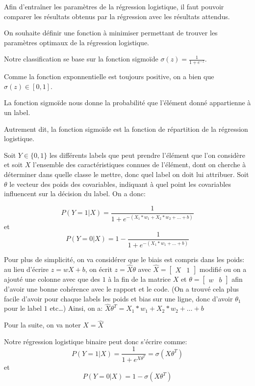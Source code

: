 \documentclass[
]{article}
\begin{document}
Afin d'entraîner les paramètres de la régression logistique, il faut
pouvoir comparer les résultats obtenus par la régression avec les
résultats attendus.

On souhaite définir une fonction à minimiser permettant de trouver les
paramètres optimaux de la régression logistique.

Notre classification se base sur la fonction sigmoïde
\(\sigma(z) = \frac{1}{1 + e^{-z}}\).

Comme la fonction exponnentielle est toujours positive, on a bien que
\(\sigma(z) \in [0, 1]\).

La fonction sigmoïde nous donne la probabilité que l'élément donné
appartienne à un label.

Autrement dit, la fonction sigmoïde est la fonction de répartition de la
régression logistique.

Soit \(Y \in \{0, 1\}\) les différents labels que peut prendre l'élément
que l'on considère et soit \(X\) l'ensemble des caractéristiques connues
de l'élément, dont on cherche à déterminer dans quelle classe le mettre,
donc quel label on doit lui attribuer. Soit \(\theta\) le vecteur des
poids des covariables, indiquant à quel point les covariables
influencent sur la décision du label. On a donc:

\[P(Y = 1 | X) = \frac{1}{1 + e^{-(X_1 * w_1 + X_2*w_2 + \dots + b)}}\]
et \[P(Y = 0 | X) = 1 - \frac{1}{1 + e^{-(X_1 * w_1 + \dots + b)}}\]

Pour plus de simplicité, on va considérer que le biais est compris dans
les poids: au lieu d'écrire \(z = wX + b\), on écrit
\(z = \hat{X}\theta\) avec
\(\hat{X} = \begin{bmatrix} X & 1 \end{bmatrix}\) modifié ou on a ajouté
une colonne avec que des \(1\) à la fin de la matrice \(X\) et
\(\theta = \begin{bmatrix} w & b \end{bmatrix}\) afin d'avoir une bonne
cohérence avec le rapport et le code. (On a trouvé cela plus facile
d'avoir pour chaque labels les poids et bias sur une ligne, donc d'avoir
\(\theta_1\) pour le label \(1\) etc\ldots) Ainsi, on a:
\(\hat{X} \theta^T = X_1 * w_1 + X_2 * w_2 + \dots + b\)

Pour la suite, on va noter \(X = \hat{X}\)

Notre régression logistique binaire peut donc s'écrire comme:
\[P(Y = 1 | X) = \frac{1}{1 + e^{X \theta^T}} = \sigma(X \theta^T)\] et
\[P(Y = 0 | X) = 1 - \sigma(X \theta^T)\]
\end{document}

